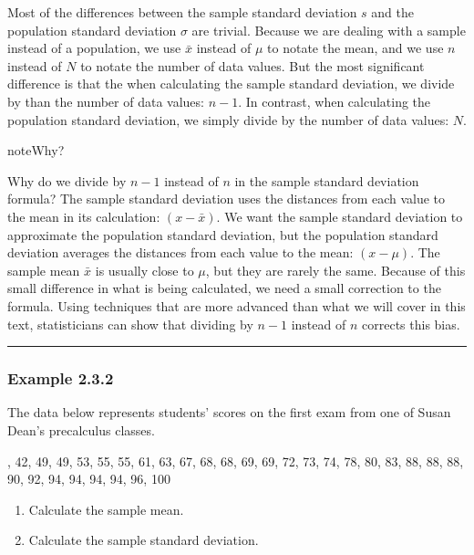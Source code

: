 \documentclass[letterpaper,10pt,english]{jupyterBook}
\begin{document}
\sphinxAtStartPar
Most of the differences between the sample standard deviation \(s\) and the population standard deviation \(\sigma\) are trivial. Because we are dealing with a sample instead of a population, we use \(\bar{x}\) instead of \(\mu\) to notate the mean, and we use \(n\) instead of \(N\) to notate the number of data values. But the most significant difference is that the when calculating the sample standard deviation, we divide by  than the number of data values: \(n - 1\). In contrast, when calculating the population standard deviation, we simply divide by the number of data values: \(N\).

\begin{sphinxadmonition}{note}{Why?}

\sphinxAtStartPar
Why do we divide by \(n - 1\) instead of \(n\) in the sample standard deviation formula? The sample standard deviation uses the distances from each value to the  mean in its calculation: \((x - \bar{x})\). We want the sample standard deviation to approximate the population standard deviation, but the population standard deviation averages the distances from each value to the  mean: \((x - \mu)\). The sample mean \(\bar{x}\) is usually close to \(\mu\), but they are rarely the same. Because of this small difference in what is being calculated, we need a small correction to the formula. Using techniques that are more advanced than what we will cover in this text, statisticians can show that dividing by \(n - 1\) instead of \(n\) corrects this bias.
\end{sphinxadmonition}


\bigskip\hrule\bigskip



\subsubsection{Example 2.3.2}
\label{\detokenize{Ch2 Descriptive Statistics/2.3 Measures of Dispersion:example-2-3-2}}
\sphinxAtStartPar
The data below represents students’ scores on the first exam from one of Susan Dean’s precalculus classes.

, 42, 49, 49, 53, 55, 55, 61, 63, 67, 68, 68, 69, 69, 72, 73, 74, 78, 80, 83, 88, 88, 88, 90, 92, 94, 94, 94, 94, 96, 100
\begin{enumerate}
%
\item {} 
\sphinxAtStartPar
Calculate the sample mean.

\item {} 
\sphinxAtStartPar
Calculate the sample standard deviation.

\end{enumerate}
\end{document}
